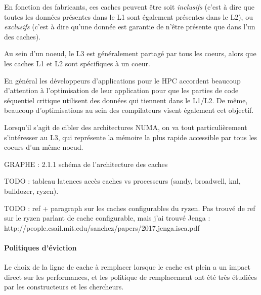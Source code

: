 En fonction des fabricants, ces caches peuvent être soit \emph{inclusifs} (c'est à dire que toutes les données présentes dans le L1 sont également présentes dans le L2), ou \emph{exclusifs} (c'est à dire qu'une donnée est garantie de n'être présente que dans l'un des caches).

Au sein d'un noeud, le L3 est généralement partagé par tous les coeurs, alors que les caches L1 et L2 sont spécifiques à un coeur.

En général les développeurs d'applications pour le HPC accordent beaucoup d'attention à l'optimisation de leur application pour que les parties de code séquentiel critique utilisent des données qui tiennent dans le L1/L2.
De même, beaucoup d'optimisations au sein des compilateurs visent également cet objectif.

Lorsqu'il s'agit de cibler des architectures NUMA, on va tout particulièrement s'intéresser au L3, qui représente la mémoire la plus rapide accessible par tous les coeurs d'un même noeud.

\begin{todo}
GRAPHE : 2.1.1 schéma de l'architecture des caches

TODO : tableau latences accès caches vs processeurs (sandy, broadwell, knl, bulldozer, ryzen).

TODO : ref + paragraph sur les caches configurables du ryzen.
Pas trouvé de ref sur le ryzen parlant de cache configurable, mais j'ai trouvé Jenga : http://people.csail.mit.edu/sanchez/papers/2017.jenga.isca.pdf
\end{todo}

\paragraph{Politiques d'éviction}

Le choix de la ligne de cache à remplacer lorsque le cache est plein a un impact direct sur les performances, et les politique de remplacement ont été très étudiées par les constructeurs et les chercheurs.

